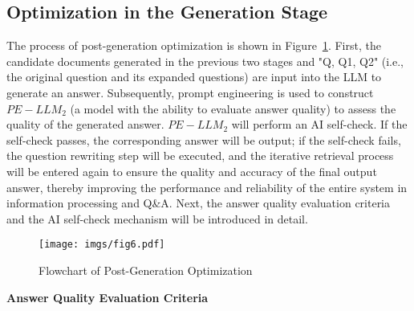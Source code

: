 \subsection{Optimization in the Generation Stage}\label{bijection}




The process of post-generation optimization is shown in Figure~\ref{fig:fig6}. First, the candidate documents generated in the previous two stages and "Q, Q1, Q2" (i.e., the original question and its expanded questions) are input into the LLM to generate an answer. Subsequently, prompt engineering is used to construct $PE-LLM_2$ (a model with the ability to evaluate answer quality) to assess the quality of the generated answer. $PE-LLM_2$ will perform an AI self-check. If the self-check passes, the corresponding answer will be output; if the self-check fails, the question rewriting step will be executed, and the iterative retrieval process will be entered again to ensure the quality and accuracy of the final output answer, thereby improving the performance and reliability of the entire system in information processing and Q\&A. Next, the answer quality evaluation criteria and the AI self-check mechanism will be introduced in detail.
\begin{figure} [h] \small
    \centering
    \texttt{[image: imgs/fig6.pdf]}
    \vspace{-5pt}
    \caption{ Flowchart of Post-Generation Optimization}
    \label{fig:fig6}
\end{figure}


\textbf{Answer Quality Evaluation Criteria}

